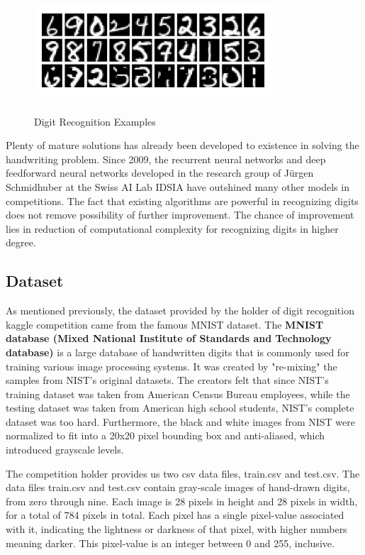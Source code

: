 \documentclass{article} %
\begin{document}
\begin{figure}[h]
    \centering
    \includegraphics[width=3.5in,height=1.5in]{./857453.jpg}\\
    \caption{Digit Recognition Examples}
\end{figure}

Plenty of mature solutions has already been developed to existence in solving
the handwriting problem. 
Since 2009, the recurrent neural networks and deep feedforward neural networks
developed in the research group of Jürgen Schmidhuber at the Swiss AI Lab
IDSIA have outshined many other models in competitions.
The fact that existing algorithms are powerful in recognizing digits does not
remove possibility of further improvement. The chance of improvement lies in
reduction of computational complexity for recognizing digits in higher degree.

\subsection{Dataset}
As mentioned previously, the dataset provided by the holder of digit
recognition kaggle competition came from the famous MNIST dataset.
The {\bf MNIST database (Mixed National Institute of Standards and Technology
    database)} is a large database of handwritten digits that is commonly used for
training various image processing systems. It was created by "re-mixing" the
samples from NIST's original datasets. The creators felt that since NIST's
training dataset was taken from American Census Bureau employees, while the
testing dataset was taken from American high school students, NIST's complete
dataset was too hard. Furthermore, the black and white images from NIST were
normalized to fit into a 20x20 pixel bounding box and anti-aliased, which
introduced grayscale levels.

The competition holder provides us two csv data files, train.csv and test.csv.
The data files train.csv and test.csv contain gray-scale images of hand-drawn
digits, from zero through nine.  Each image is 28 pixels in height and 28
pixels in width, for a total of 784 pixels in total. Each pixel has a single
pixel-value associated with it, indicating the lightness or darkness of that
pixel, with higher numbers meaning darker. This pixel-value is an integer
between 0 and 255, inclusive.
\end{document}
